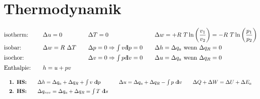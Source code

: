 
\section{Thermodynamik}
%
	\skipabove{-15pt}
		\[ \arraycolsep=0em %
		\begin{array}{l p{2em} l p{2em} l p{2em} l}
			\text{isotherm:}  && \Delta u=0           && \Delta T=0                               && \Delta w = + R\ T  \ln \left(\dfrac{v_1}{v_2} \right) = - R\ T \ln \left(\dfrac{p_1}{p_2}\right) \\
			\text{isobar:}    && \Delta w=R\ \Delta T && \Delta p=0 \Rightarrow \int{}v\dd p=0    && \Delta h = \Delta q_a \text{ wenn } \Delta q_R = 0                                                 \\
			\text{isochor:}   &&                      && \Delta v=0 \Rightarrow \int p\dd v=0     && \Delta u = \Delta q_a \text{ wenn } \Delta q_R = 0                                                 \\
			\text{Enthalpie:} && h=u+pv               && %
		\end{array} \]
	\skipabove{-10pt}
		\[ \arraycolsep=1em  \def\arraystretch{1.4}
		\begin{array}{llll}
			\textbf{1. HS:} & \Delta h = \Delta q_a + \Delta q_R + \int v\ \dd p    & \Delta u = \Delta q_a + \Delta q_R - \int p\ \dd v & \Delta Q + \Delta W = \Delta U + \Delta E_a \\
			\textbf{2. HS:} & \Delta q_{rev}=\Delta q_a + \Delta q_R= \int T\ \dd s &                                                    &
		\end{array} \]

